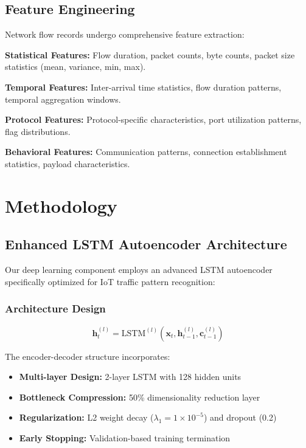 \documentclass[conference]{IEEEtran}
\begin{document}
\subsection{Feature Engineering}

Network flow records undergo comprehensive feature extraction:

\textbf{Statistical Features:} Flow duration, packet counts, byte counts, packet size statistics (mean, variance, min, max).

\textbf{Temporal Features:} Inter-arrival time statistics, flow duration patterns, temporal aggregation windows.

\textbf{Protocol Features:} Protocol-specific characteristics, port utilization patterns, flag distributions.

\textbf{Behavioral Features:} Communication patterns, connection establishment statistics, payload characteristics.

\section{Methodology}

\subsection{Enhanced LSTM Autoencoder Architecture}

Our deep learning component employs an advanced LSTM autoencoder specifically optimized for IoT traffic pattern recognition:

\subsubsection{Architecture Design}
\begin{equation}
\mathbf{h}_t^{(l)} = \text{LSTM}^{(l)}(\mathbf{x}_t, \mathbf{h}_{t-1}^{(l)}, \mathbf{c}_{t-1}^{(l)})
\end{equation}

The encoder-decoder structure incorporates:
\begin{itemize}
\item \textbf{Multi-layer Design:} 2-layer LSTM with 128 hidden units
\item \textbf{Bottleneck Compression:} 50\% dimensionality reduction layer
\item \textbf{Regularization:} L2 weight decay ($\lambda_1 = 1 \times 10^{-5}$) and dropout (0.2)
\item \textbf{Early Stopping:} Validation-based training termination
\end{itemize}
\end{document}
